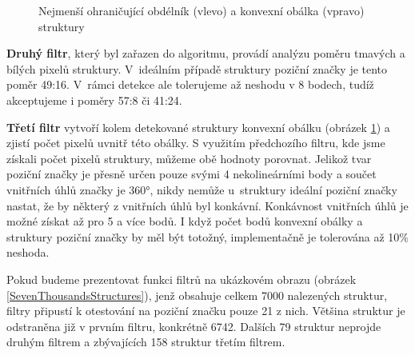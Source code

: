  \begin{figure}[H]
  \begin{center}
    \caption{Nejmenší ohraničující obdélník (vlevo) a konvexní obálka (vpravo)
    struktury}
    \label{MinimalBoundedAndConvexHull}
  \end{center}
\end{figure}

\textbf{Druhý filtr}, který byl zařazen do algoritmu, provádí analýzu poměru
tmavých a bílých pixelů struktury. V~ideálním případě struktury poziční značky
je tento poměr 49:16. V~rámci detekce ale tolerujeme až neshodu v 8 bodech,
tudíž akceptujeme i poměry 57:8 či 41:24.

\textbf{Třetí filtr} vytvoří kolem detekované struktury konvexní obálku (obrázek
\ref{MinimalBoundedAndConvexHull}) a zjistí počet pixelů uvnitř této obálky. S
využitím předchozího filtru, kde jsme získali počet pixelů struktury, můžeme obě hodnoty porovnat. Jelikož tvar
poziční značky je přesně určen pouze svými 4 nekolineárními body a součet
vnitřních úhlů značky je 360°, nikdy nemůže u~struktury ideální poziční značky
nastat, že by některý z vnitřních úhlů byl konkávní. Konkávnost vnitřních úhlů je možné
získat až pro 5 a více bodů. I když počet bodů konvexní obálky a struktury
poziční značky by měl být totožný, implementačně je tolerována až 10\% neshoda.

Pokud budeme prezentovat funkci filtrů na ukázkovém obrazu (obrázek
\ref{SevenThousandsStructures}), jenž obsahuje celkem 7000 nalezených struktur, filtry připustí k otestování na
poziční značku pouze 21 z nich. Většina struktur je odstraněna již v prvním
filtru, konkrétně 6742. Dalších 79 struktur neprojde druhým filtrem a
zbývajících 158 struktur třetím filtrem.  


